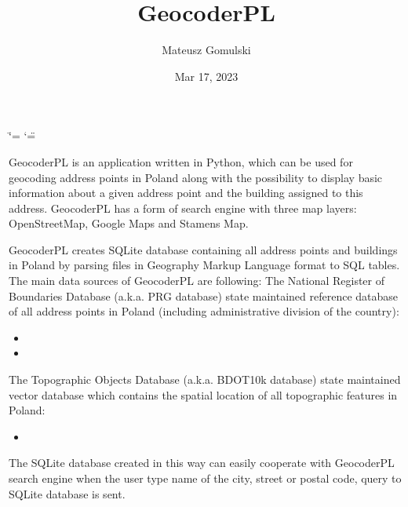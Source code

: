 \documentclass[letterpaper,10pt,english]{sphinxmanual}
\title{GeocoderPL}
\date{Mar 17, 2023}
\author{Mateusz Gomulski}
\begin{document}
\ifdefined\shorthandoff
  \ifnum\catcode`\=\string=\active\shorthandoff{=}\fi
  \ifnum\catcode`\"=\active{}\fi
\fi

\pagestyle{empty}
\sphinxmaketitle
\pagestyle{plain}
\sphinxtableofcontents
\pagestyle{normal}
\label{\detokenize{index::doc}}


\sphinxAtStartPar
GeocoderPL is an application written in Python, which can be used for geocoding address points in Poland along with the possibility to display basic information about a given address point and the building assigned to this address. GeocoderPL has a form of search engine with three map layers: OpenStreetMap, Google Maps and Stamens Map.

\sphinxAtStartPar
GeocoderPL creates SQLite database containing all address points and buildings in Poland by parsing files in Geography Markup Language format to SQL tables. The main data sources of GeocoderPL are following:
The National Register of Boundaries Database (a.k.a. PRG database)\sphinxhyphen{} state maintained reference database of all address points in Poland (including administrative division of the country):
\begin{itemize}
\item {} 
\sphinxAtStartPar
{}

\item {} 
\sphinxAtStartPar
{}

\end{itemize}

\sphinxAtStartPar
The Topographic Objects Database (a.k.a. BDOT10k database) \sphinxhyphen{} state maintained vector database which contains the spatial location of all topographic features in Poland:
\begin{itemize}
\item {} 
\sphinxAtStartPar
{}

\end{itemize}

\sphinxAtStartPar
The SQLite database created in this way can easily cooperate with GeocoderPL search engine \sphinxhyphen{} when the user type name of the city, street or postal code, query to SQLite database is sent.
\end{document}
